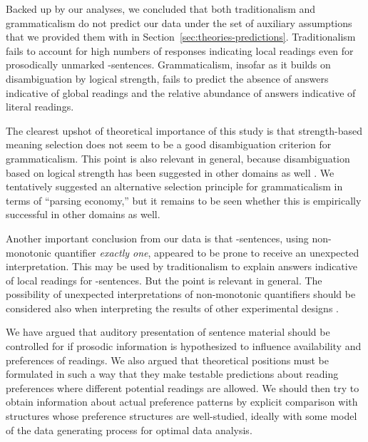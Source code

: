 \documentclass[fleqn,reqno,10pt]{article}
\renewcommand{\es}{\acro{es}}
\begin{document}
Backed up by our analyses, we concluded that both traditionalism and
grammaticalism do not predict our data under the set of auxiliary
assumptions that we provided them with in
Section~\ref{sec:theories-predictions}. Traditionalism fails to
account for high numbers of responses indicating local readings even
for prosodically unmarked \es-sentences. Grammaticalism, insofar as it
builds on disambiguation by logical strength, fails to predict the
absence of answers indicative of global readings and the relative
abundance of answers indicative of literal readings.

The clearest upshot of theoretical importance of this study is that
strength-based meaning selection does not seem to be a good
disambiguation criterion for grammaticalism. This point is also
relevant in general, because disambiguation based on logical strength
has been suggested in other domains as well
\citep[e.g.][]{DalrympleKanazawa1998:Reciprocal-Expr,Winter2001:Plural-Predicat,CobrerosEgre2012:Tolerant-Classi}.
We tentatively suggested an alternative selection principle for
grammaticalism in terms of ``parsing economy,'' but it remains to be
seen whether this is empirically successful in other domains as well.

Another important conclusion from our data is that \es-sentences,
using non-monotonic quantifier \emph{exactly one}, appeared to be
prone to receive an unexpected interpretation. This may be used by
traditionalism to explain answers indicative of local readings for
\es-sentences. But the point is relevant in general. The possibility
of unexpected interpretations of non-monotonic quantifiers should be
considered also when interpreting the results of other experimental
designs \citep[e.g.][]{CliftonDube2010:Embedded-Implic,
  ChemlaSpector2010:Experimental-Ev}.

We have argued that auditory presentation of sentence material should
be controlled for if prosodic information is hypothesized to influence
availability and preferences of readings. We also argued that
theoretical positions must be formulated in such a way that they make
testable predictions about reading preferences where different
potential readings are allowed. We should then try to obtain
information about actual preference patterns by explicit comparison
with structures whose preference structures are well-studied, ideally
with some model of the data generating process for optimal data
analysis.

\newpage

\appendix
\end{document}
